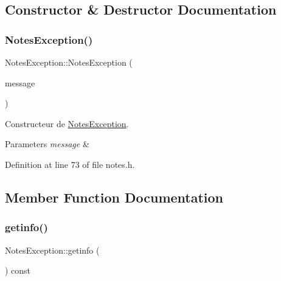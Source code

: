 \subsection{Constructor \& Destructor Documentation}
\mbox{\label{class_notes_exception_af10aca61d1cb993b62e868f0fe9bf144}} 
\subsubsection{\texorpdfstring{Notes\+Exception()}{NotesException()}}
{\footnotesize\ttfamily Notes\+Exception\+::\+Notes\+Exception (\begin{DoxyParamCaption}\item[{const Q\+String \&}]{message }\end{DoxyParamCaption})\hspace{0.3cm}{\ttfamily [inline]}}



Constructeur de \hyperlink{class_notes_exception}{Notes\+Exception}. 


\begin{DoxyParams}{Parameters}
{\em message} & \\
\hline
\end{DoxyParams}


Definition at line 73 of file notes.\+h.



\subsection{Member Function Documentation}
\mbox{\label{class_notes_exception_a3c595994b69172290b548fdac074248d}} 
\subsubsection{\texorpdfstring{getinfo()}{getinfo()}}
{\footnotesize\ttfamily Notes\+Exception\+::getinfo (\begin{DoxyParamCaption}{ }\end{DoxyParamCaption}) const\hspace{0.3cm}{\ttfamily [inline]}}



